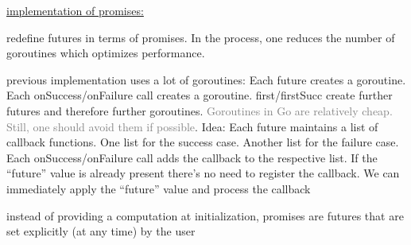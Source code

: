 \documentclass[landscape, a4paper]{article}
\begin{document}
\begin{minipage}[t]{0.2\linewidth}
  \begin{betterlist}
		\item \underline{implementation of promises:}
		\begin{betterlist}
			\item redefine futures in terms of promises. In the process, one \alert{reduces} the \alert{number of goroutines} which optimizes performance.
      \item previous implementation uses a lot of goroutines: Each future creates a goroutine. Each onSuccess/onFailure call creates a goroutine. first/firstSucc create further futures and therefore further goroutines. \textcolor{gray}{Goroutines in Go are relatively cheap. Still, one should avoid them if possible}. Idea: Each future maintains a list of callback functions. One list for the success case. Another list for the failure case. Each onSuccess/onFailure call adds the callback to the respective list. If the \enquote{future} value is already present there’s no need to register the callback. We can immediately apply the \enquote{future} value and process the callback
      \item instead of providing a computation at initialization, promises are futures that are set explicitly (at any time) by the user
		\end{betterlist}
\end{betterlist}
\end{minipage}
\end{document}
